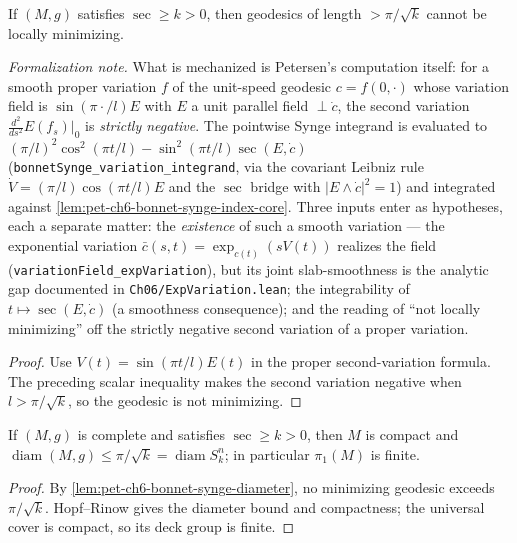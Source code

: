 \begin{lemma}
  \label{lem:pet-ch6-bonnet-synge-diameter}
  \leanok
  If $(M,g)$ satisfies $\sec\ge k>0$, then geodesics of length $>\pi/\sqrt k$
  cannot be locally minimizing.

  \emph{Formalization note.} What is mechanized is Petersen's computation itself: for a smooth
  proper variation $f$ of the unit-speed geodesic $c=f(0,\cdot)$ whose variation field is
  $\sin(\pi\cdot/l)E$ with $E$ a unit parallel field $\perp\dot c$, the second variation
  $\tfrac{d^2}{ds^2}E(f_s)|_{0}$ is \emph{strictly negative}. The pointwise Synge integrand is
  evaluated to $(\pi/l)^2\cos^2(\pi t/l)-\sin^2(\pi t/l)\sec(E,\dot c)$
  (\texttt{bonnetSynge\_variation\_integrand}, via the covariant Leibniz rule
  $\dot V=(\pi/l)\cos(\pi t/l)E$ and the $\sec$ bridge with $|E\wedge\dot c|^2=1$) and
  integrated against \cref{lem:pet-ch6-bonnet-synge-index-core}. Three inputs enter as
  hypotheses, each a separate matter: the \emph{existence} of such a smooth variation — the
  exponential variation $\bar c(s,t)=\exp_{c(t)}(sV(t))$ realizes the field
  (\texttt{variationField\_expVariation}), but its joint slab-smoothness is the analytic gap
  documented in \texttt{Ch06/ExpVariation.lean}; the integrability of $t\mapsto\sec(E,\dot c)$
  (a smoothness consequence); and the reading of ``not locally minimizing'' off the strictly
  negative second variation of a proper variation.
\end{lemma}
\begin{proof}
  \sketch
  Use \(V(t)=\sin(\pi t/l)E(t)\) in the proper second-variation formula. The preceding scalar inequality makes the second variation negative when \(l>\pi/\sqrt{k}\), so the geodesic is not minimizing.
\end{proof}

\begin{corollary}
  \label{cor:pet-ch6-hopf-rinow-myers-diameter}
  \notready
  If $(M,g)$ is complete and satisfies $\sec\ge k>0$, then $M$ is compact and
  $\operatorname{diam}(M,g)\le\pi/\sqrt k=\operatorname{diam}S^n_k$; in particular $\pi_1(M)$ is
  finite.
\end{corollary}
\begin{proof}
  \sketch
  By \cref{lem:pet-ch6-bonnet-synge-diameter}, no minimizing geodesic exceeds \(\pi/\sqrt{k}\). Hopf--Rinow gives the diameter bound and compactness; the universal cover is compact, so its deck group is finite.
\end{proof}

